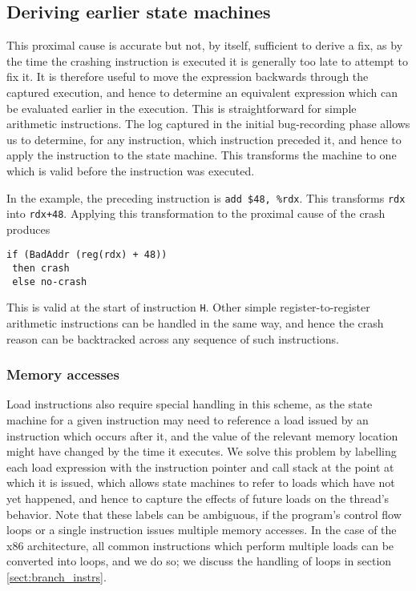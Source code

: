 \documentclass[10pt,twocolumn,preprint,natbib,authoryear]{sigplanconf}
\begin{document}
\subsection{Deriving earlier state machines}
This proximal cause is accurate but not, by itself, sufficient to
derive a fix, as by the time the crashing instruction is executed it
is generally too late to attempt to fix it.  It is therefore useful to
move the expression backwards through the captured execution, and
hence to determine an equivalent expression which can be evaluated
earlier in the execution.  This is straightforward for simple
arithmetic instructions.  The log captured in the initial
bug-recording phase allows us to determine, for any instruction, which
instruction preceded it, and hence to apply the instruction to the
state machine.  This transforms the machine to one which is valid
before the instruction was executed.

In the example, the preceding instruction is \verb|add $48, %rdx|.
This transforms \verb|rdx| into \verb|rdx+48|.  Applying this
transformation to the proximal cause of the crash produces

\begin{verbatim}
if (BadAddr (reg(rdx) + 48))
 then crash
 else no-crash
\end{verbatim}

This is valid at the start of instruction \verb|H|.  Other simple
register-to-register arithmetic instructions can be handled in the
same way, and hence the crash reason can be backtracked across any
sequence of such instructions.

\subsubsection{Memory accesses}

Load instructions also require special handling in this scheme, as the
state machine for a given instruction may need to reference a load
issued by an instruction which occurs after it, and the value of the
relevant memory location might have changed by the time it executes.
We solve this problem by labelling each load expression with the
instruction pointer and call stack at the point at which it is issued,
which allows state machines to refer to loads which have not yet
happened, and hence to capture the effects of future loads on the
thread's behavior.  Note that these labels can be ambiguous, if the
program's control flow loops or a single instruction issues multiple
memory accesses.  In the case of the x86 architecture, all common
instructions which perform multiple loads can be converted into loops,
and we do so; we discuss the handling of loops in section
\ref{sect:branch_instrs}.
\end{document}

